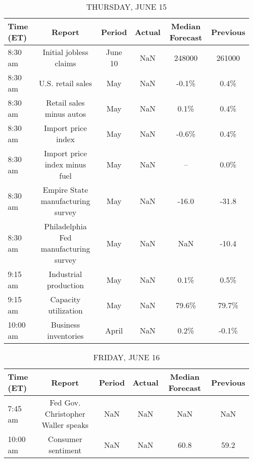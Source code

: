 \documentclass{article}%
\begin{document}
\begin{table}[htbp]%
\caption{THURSDAY, JUNE 15}%
\centering%
\begin{adjustbox}{width=1\textwidth}%
\begin{tabular}{lccccc}
\toprule
Time (ET) &                                Report &  Period & Actual & Median Forecast & Previous \\
\midrule
  8:30 am &                Initial jobless claims & June 10 &    NaN &          248000 &   261000 \\
  8:30 am &                     U.S. retail sales &     May &    NaN &           -0.1\% &     0.4\% \\
  8:30 am &              Retail sales minus autos &     May &    NaN &            0.1\% &     0.4\% \\
  8:30 am &                    Import price index &     May &    NaN &           -0.6\% &     0.4\% \\
  8:30 am &         Import price index minus fuel &     May &    NaN &              -- &     0.0\% \\
  8:30 am &     Empire State manufacturing survey &     May &    NaN &           -16.0 &    -31.8 \\
  8:30 am & Philadelphia Fed manufacturing survey &     May &    NaN &             NaN &    -10.4 \\
  9:15 am &                 Industrial production &     May &    NaN &            0.1\% &     0.5\% \\
  9:15 am &                  Capacity utilization &     May &    NaN &           79.6\% &    79.7\% \\
 10:00 am &                  Business inventories &   April &    NaN &            0.2\% &    -0.1\% \\
\bottomrule
\end{tabular}
%
\end{adjustbox}%
\end{table}

%


\begin{table}[htbp]%
\caption{FRIDAY, JUNE 16}%
\centering%
\begin{adjustbox}{width=1\textwidth}%
\begin{tabular}{lccccc}
\toprule
Time (ET) &                             Report & Period & Actual & Median Forecast & Previous \\
\midrule
  7:45 am & Fed Gov. Christopher Waller speaks &    NaN &    NaN &             NaN &      NaN \\
 10:00 am &                 Consumer sentiment &    NaN &    NaN &            60.8 &     59.2 \\
\bottomrule
\end{tabular}
%
\end{adjustbox}%
\end{table}
\end{document}
